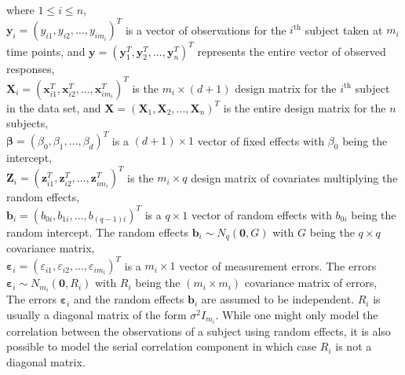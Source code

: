 where $1 \le i \le n$,\\
$\boldsymbol{y}_i = {(y_{i1}, y_{i2}, \ldots, y_{im_i})}^T$ is a vector of observations for the $i^\text{th}$ subject taken at $m_i$ time points, and $\boldsymbol{y} = {(\boldsymbol{y}_1^T, \boldsymbol{y}_2^T, ..., \boldsymbol{y}_n^T)}^T$ represents the entire vector of observed responses,\\
$\boldsymbol{X}_i = {(\boldsymbol{x}_{i1}^T, \boldsymbol{x}_{i2}^T, \ldots, \boldsymbol{x}_{im_i}^T)}^T$ is the $m_i \times (d+1)$ design matrix for the $i^\text{th}$ subject in the data set, and $\boldsymbol{X} = {(\boldsymbol{X}_1, \boldsymbol{X}_2, ..., \boldsymbol{X}_n)}^T$ is the entire design matrix for the $n$ subjects,\\
$\boldsymbol{\beta} = {(\beta_0, \beta_1, \ldots, \beta_d)}^T$ is a $(d+1) \times 1$ vector of fixed effects with $\beta_0$ being the intercept,\\
$\boldsymbol{Z}_i = {(\boldsymbol{z}_{i1}^T, \boldsymbol{z}_{i2}^T, \ldots, \boldsymbol{z}_{im_i}^T)}^T$ is the $m_i \times q$ design matrix of covariates multiplying the random effects,\\
$\boldsymbol{b}_i = {(b_{0i}, b_{1i}, \ldots, b_{(q-1)i})}^T$ is a $q \times 1$ vector of random effects with $b_{0i}$ being the random intercept. The random effects $\boldsymbol{b}_i \sim N_q(\boldsymbol{0}, G)$ with $G$ being the $q \times q$ covariance matrix,\\ 
$\boldsymbol{\varepsilon}_{i} = {(\varepsilon_{i1}, \varepsilon_{i2}, \ldots, \varepsilon_{im_i})}^T$ is a $m_i \times 1$ vector of measurement errors. The errors $\boldsymbol{\varepsilon}_{i} \sim N_{m_i}(\boldsymbol{0}, R_i)$ with $R_i$ being the $(m_i \times m_i)$ covariance matrix of errors,\\

The errors $\boldsymbol{\varepsilon}_{i}$ and the random effects $\boldsymbol{b}_i$ are assumed to be independent. $R_i$ is usually a diagonal matrix of the form $\sigma^2I_{m_i}$. While one might only model the correlation between the observations of a subject using random effects, it is also possible to model the serial correlation component in which case $R_i$ is not a diagonal matrix. 

